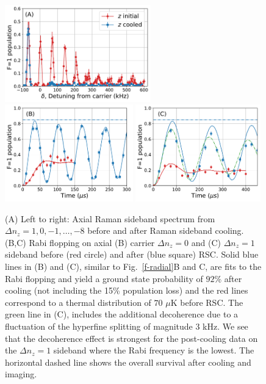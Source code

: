 \documentclass[aps,prl,twocolumn,groupedaddress]{revtex4-1}
\begin{document}
\begin{figure}
  \includegraphics[height=4.2cm]{imgs/spectrum_a1.pdf}
  \includegraphics[height=4.2cm]{imgs/rabi_flop_a1_0.pdf}
  \includegraphics[height=4.2cm]{imgs/rabi_flop_a1_p1.pdf}
  \caption{(A) Left to right: Axial Raman sideband spectrum from $\Delta n_z=1,0,-1,\ldots,-8$
    before and after Raman sideband cooling.
    (B,C) Rabi flopping on axial (B) carrier $\Delta n_z=0$  and (C) $\Delta n_z=1$ sideband
    before (red circle) and after (blue square) RSC.
    Solid blue lines in (B) and (C), similar to Fig.~\ref{f-radial}B and C,
    are fits to the Rabi flopping and yield a ground state probability of $92$\%
    after cooling (not including the 15\% population loss) and
    the red lines correspond to a thermal distribution of $70$ $\mu$K before RSC.
    The green line in (C), includes the additional decoherence due to
    a fluctuation of the hyperfine splitting of magnitude $3$ kHz.
    We see that the decoherence effect is strongest for the post-cooling data on
    the $\Delta n_z=1$ sideband where the Rabi frequency is the lowest.
    The horizontal dashed line shows the overall survival after cooling and imaging.
    \label{f-axial}}
\end{figure}
\end{document}
